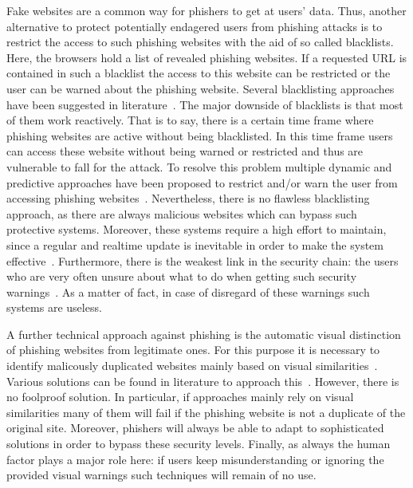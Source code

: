 \begin{description}[leftmargin=0cm]
	\item[Blacklists] Fake websites are a common way for phishers to get at users' data. Thus, another alternative to protect potentially endagered users from phishing attacks is to restrict the access to such phishing websites with the aid of so called blacklists. Here, the browsers hold a list of revealed phishing websites. If a requested URL is contained in such a blacklist the access to this website can be restricted or the user can be warned about the phishing website. Several blacklisting approaches have been suggested in literature~\cite{ma2009beyond, zhang2008highly}. The major downside of blacklists is that most of them work reactively. That is to say, there is a certain time frame where phishing websites are active without being blacklisted. In this time frame users can access these website without being warned or restricted and thus are vulnerable to fall for the attack. To resolve this problem multiple dynamic and predictive approaches have been proposed to restrict and/or warn the user from accessing phishing websites~\cite{prakash2010phishnet, obied2009fraudulent}. Nevertheless, there is no flawless blacklisting approach, as there are always malicious websites which can bypass such protective systems. Moreover, these systems require a high effort to maintain, since a regular and realtime update is inevitable in order to make the system effective~\cite{purkait2012phishing}. Furthermore, there is the weakest link in the security chain: the users who are very often unsure about what to do when getting such security warnings~\cite{bakhshi2009social}. As a matter of fact, in case of disregard of these warnings such systems are useless.
	\item[Visual distinction] A further technical approach against phishing is the automatic visual distinction of phishing websites from legitimate ones. For this purpose it is necessary to identify malicously duplicated websites mainly based on visual similarities~\cite{liu2006antiphishing}. Various solutions can be found in literature to approach this~\cite{chen2009fighting,chen2010detecting,zhang2011textual}. However, there is no foolproof solution. In particular, if approaches mainly rely on visual similarities many of them will fail if the phishing website is not a duplicate of the original site. Moreover, phishers will always be able to adapt to sophisticated solutions in order to bypass these security levels. Finally, as always the human factor plays a major role here: if users keep misunderstanding or ignoring the provided visual warnings such techniques will remain of no use.

\end{description}
